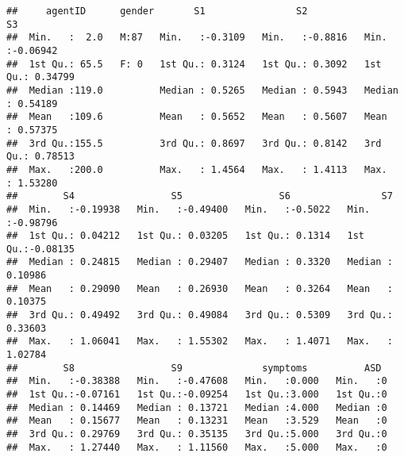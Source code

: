 \documentclass[]{article}
\newenvironment{Shaded}{\begin{snugshade}}{\end{snugshade}}
\newcommand{\KeywordTok}[1]{\textcolor[rgb]{0.13,0.29,0.53}{\textbf{#1}}}
\newcommand{\StringTok}[1]{\textcolor[rgb]{0.31,0.60,0.02}{#1}}
\newcommand{\CommentTok}[1]{\textcolor[rgb]{0.56,0.35,0.01}{\textit{#1}}}
\newcommand{\OperatorTok}[1]{\textcolor[rgb]{0.81,0.36,0.00}{\textbf{#1}}}
\newcommand{\NormalTok}[1]{#1}
\begin{document}
\begin{verbatim}
##     agentID      gender       S1                S2                S3          
##  Min.   :  2.0   M:87   Min.   :-0.3109   Min.   :-0.8816   Min.   :-0.06942  
##  1st Qu.: 65.5   F: 0   1st Qu.: 0.3124   1st Qu.: 0.3092   1st Qu.: 0.34799  
##  Median :119.0          Median : 0.5265   Median : 0.5943   Median : 0.54189  
##  Mean   :109.6          Mean   : 0.5652   Mean   : 0.5607   Mean   : 0.57375  
##  3rd Qu.:155.5          3rd Qu.: 0.8697   3rd Qu.: 0.8142   3rd Qu.: 0.78513  
##  Max.   :200.0          Max.   : 1.4564   Max.   : 1.4113   Max.   : 1.53280  
##        S4                 S5                 S6                S7          
##  Min.   :-0.19938   Min.   :-0.49400   Min.   :-0.5022   Min.   :-0.98796  
##  1st Qu.: 0.04212   1st Qu.: 0.03205   1st Qu.: 0.1314   1st Qu.:-0.08135  
##  Median : 0.24815   Median : 0.29407   Median : 0.3320   Median : 0.10986  
##  Mean   : 0.29090   Mean   : 0.26930   Mean   : 0.3264   Mean   : 0.10375  
##  3rd Qu.: 0.49492   3rd Qu.: 0.49084   3rd Qu.: 0.5309   3rd Qu.: 0.33603  
##  Max.   : 1.06041   Max.   : 1.55302   Max.   : 1.4071   Max.   : 1.02784  
##        S8                 S9              symptoms          ASD   
##  Min.   :-0.38388   Min.   :-0.47608   Min.   :0.000   Min.   :0  
##  1st Qu.:-0.07161   1st Qu.:-0.09254   1st Qu.:3.000   1st Qu.:0  
##  Median : 0.14469   Median : 0.13721   Median :4.000   Median :0  
##  Mean   : 0.15677   Mean   : 0.13231   Mean   :3.529   Mean   :0  
##  3rd Qu.: 0.29769   3rd Qu.: 0.35135   3rd Qu.:5.000   3rd Qu.:0  
##  Max.   : 1.27440   Max.   : 1.11560   Max.   :5.000   Max.   :0
\end{verbatim}

\begin{Shaded}
\end{Shaded}
\end{document}
